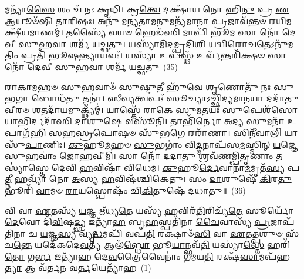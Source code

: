 𑌮𑌨𑍍𑌯𑌾᳴\-\ul{𑌸𑍈} 𑌶𑌂 𑌚᳴ 𑌨𑌃 𑌕𑍃𑌧𑌿। 𑌕𑍍𑌰\-\ul{𑌤𑍍𑌵𑍇} 𑌦𑌕𑍍𑌷𑌾᳴𑌯 𑌨𑍋 𑌹𑌿\-\ul{𑌨𑍁} 𑌪𑍍𑌰 \ul{𑌣} 𑌆𑌯𑍂𑍞᳴𑌷𑌿 𑌤𑌾𑌰𑌿𑌷𑌃। 𑌅𑌨𑍁᳴ 𑌮𑌨𑍍𑌯𑌤𑌾𑌮\-\ul{𑌨𑍁}\-𑌮𑌨𑍍𑌯᳴𑌮𑌾𑌨𑌾 \ul{𑌪𑍍𑌰}\-𑌜𑌾𑌵᳴𑌨𑍍𑌤𑍞 \ul{𑌰}\-𑌯𑌿𑌮𑌕𑍍𑌷𑍀᳴𑌯𑌮𑌾𑌣𑌮𑍍। 𑌤𑌸𑍍𑌯𑍈᳴ \ul{𑌵}\-𑌯𑍞 𑌹𑍇𑌡᳴\-\ul{𑌸𑌿} 𑌮𑌾𑌪𑌿᳴ 𑌭𑍂\-\ul{𑌮} 𑌸𑌾 𑌨𑍋᳴ \ul{𑌦𑍇}\-𑌵𑍀 \ul{𑌸𑍁}\-𑌹\-\ul{𑌵𑌾} 𑌶𑌰𑍍𑌮᳴ 𑌯𑌚𑍍𑌛𑌤𑍁। 𑌯𑌸𑍍𑌯𑌾᳴\-\ul{𑌮𑌿}\-𑌦\-\ul{𑌮𑍍𑌪𑍍𑌰}\-𑌦𑌿\-\ul{𑌶𑌿} 𑌯\-\ul{𑌦𑍍𑌵𑌿}\-𑌰𑍋\-\ul{𑌚}\-𑌤𑍇\-𑌽𑌨𑍁᳴𑌮\-\ul{𑌤𑌿𑌂} 𑌪𑍍𑌰𑌤𑌿᳴ 𑌭𑍂𑌷\-\ul{𑌨𑍍𑌤𑍍𑌯𑌾}\-𑌯𑌵𑌃᳴। 𑌯𑌸𑍍𑌯𑌾᳴ \ul{𑌉}\-𑌪𑌸𑍍𑌥᳴ \ul{𑌉}\-𑌰𑍍𑌵᳴𑌨𑍍𑌤𑌰𑌿᳴\-\ul{𑌕𑍍𑌷}\-\-\ul{𑍞} 𑌸𑌾 𑌨𑍋᳴ \ul{𑌦𑍇}\-𑌵𑍀 \ul{𑌸𑍁}\-𑌹\-\ul{𑌵𑌾} 𑌶𑌰𑍍𑌮᳴ 𑌯𑌚𑍍𑌛𑌤𑍁~(35)

\-\ul{𑌰𑌾}\-𑌕𑌾\-\ul{𑌮}\-𑌹𑍞 \ul{𑌸𑍁}\-𑌹𑌵𑌾𑍞᳴ 𑌸𑍁\-\ul{𑌷𑍍𑌟𑍁}\-𑌤𑍀 𑌹𑍁᳴𑌵𑍇 \ul{𑌶𑍃}\-𑌣𑍋𑌤𑍁᳴ 𑌨𑌃 \ul{𑌸𑍁}\-𑌭\-\ul{𑌗𑌾} 𑌬𑍋𑌧᳴\-\ul{𑌤𑍁} 𑌤𑍍𑌮𑌨𑌾॑। 𑌸𑍀\-\ul{𑌵𑍍𑌯}\-𑌤𑍍𑌵𑌪𑌃᳴ \ul{𑌸𑍂}\-𑌚𑍍𑌯𑌾\-𑌽𑌚𑍍𑌛𑌿᳴𑌦𑍍𑌯𑌮𑌾𑌨\-\ul{𑌯𑌾} 𑌦𑌦𑌾᳴𑌤𑍁 \ul{𑌵𑍀}\-𑌰𑍞 \ul{𑌶}\-𑌤𑌦𑌾᳴𑌯\-\ul{𑌮𑍁}\-𑌕𑍍𑌥𑍍𑌯𑌮𑍍॑। 𑌯𑌾𑌸𑍍𑌤𑍇᳴ 𑌰𑌾𑌕𑍇 𑌸𑍁\-\ul{𑌮}\-𑌤𑌯𑌃᳴ \ul{𑌸𑍁}\-𑌪𑍇𑌶᳴\-\ul{𑌸𑍋} 𑌯𑌾\-\ul{𑌭𑌿}\-𑌰𑍍𑌦𑌦𑌾᳴𑌸𑌿 \ul{𑌦𑌾}\-𑌶𑍁\-\ul{𑌷𑍇} 𑌵𑌸𑍂᳴𑌨𑌿। 𑌤𑌾𑌭𑌿᳴𑌰𑍍𑌨𑍋 \ul{𑌅}\-𑌦𑍍𑌯 \ul{𑌸𑍁}\-𑌮𑌨𑌾᳴ \ul{𑌉}\-𑌪𑌾𑌗᳴𑌹𑌿 𑌸𑌹𑌸𑍍𑌰\-\ul{𑌪𑍋}\-𑌷𑍞 𑌸𑍁᳴𑌭\-\ul{𑌗𑍇} 𑌰𑌰𑌾᳴𑌣𑌾। 𑌸𑌿𑌨𑍀᳴𑌵𑌾\-\ul{𑌲𑌿} 𑌯𑌾 𑌸𑍁᳴\-\ul{𑌪𑌾}\-𑌣𑌿𑌃। \ul{𑌕𑍁}\-𑌹𑍂\-\ul{𑌮}\-𑌹𑍞 \ul{𑌸𑍁}\-𑌭𑌗𑌾𑌂॑ 𑌵𑌿\-\ul{𑌦𑍍𑌮}\-𑌨𑌾𑌪᳴𑌸\-\ul{𑌮}\-𑌸𑍍𑌮𑌿𑌨𑍍 \ul{𑌯}\-𑌜𑍍𑌞𑍇 \ul{𑌸𑍁}\-𑌹𑌵𑌾𑌂॑ 𑌜𑍋𑌹𑌵𑍀𑌮𑌿। 𑌸𑌾 𑌨𑍋᳴ 𑌦𑌦𑌾\-\ul{𑌤𑍁} 𑌶𑍍𑌰𑌵᳴𑌣𑌮𑍍𑌪𑌿\-\ul{𑌤𑍃}\-𑌣𑌾𑌂 𑌤𑌸𑍍𑌯𑌾॑𑌸𑍍𑌤𑍇 𑌦𑍇𑌵𑌿 \ul{𑌹}\-𑌵𑌿𑌷𑌾᳴ 𑌵𑌿𑌧𑍇𑌮। \ul{𑌕𑍁}\-𑌹𑍂\-\ul{𑌰𑍍𑌦𑍇}\-𑌵𑌾𑌨𑌾᳴\-\ul{𑌮}\-𑌮𑍃𑌤᳴\-\ul{𑌸𑍍𑌯} 𑌪\-\ul{𑌤𑍍𑌨𑍀} 𑌹𑌵𑍍𑌯𑌾᳴ 𑌨𑍋 \ul{𑌅}\-𑌸𑍍𑌯 \ul{𑌹}\-𑌵𑌿𑌷᳴𑌶𑍍𑌚𑌿𑌕𑍇𑌤𑍁। 𑌸𑌂 \ul{𑌦𑌾}\-𑌶𑍁𑌷𑍇᳴ \ul{𑌕𑌿}\-𑌰\-\ul{𑌤𑍁} 𑌭𑍂𑌰𑌿᳴ \ul{𑌵𑌾}\-𑌮𑍞 \ul{𑌰𑌾}\-𑌯𑌸𑍍𑌪𑍋𑌷𑌂᳴ 𑌚𑌿\-\ul{𑌕𑌿}\-𑌤𑍁𑌷𑍇᳴ 𑌦𑌧𑌾𑌤𑍁॥~(36)

{\anuvakamend[{𑌭𑌾𑌮𑌾᳴\-\ul{𑌸𑍋} 𑌦𑌾\-\ul{𑌤𑌾} 𑌤𑍍𑌵\-\ul{𑌮}\-𑌨𑍍𑌤𑌰𑌿᳴\-\ul{𑌕𑍍𑌷}\-\-\ul{𑍞} 𑌸𑌾 𑌨𑍋᳴ \ul{𑌦𑍇}\-𑌵𑍀 \ul{𑌸𑍁}\-𑌹\-\ul{𑌵𑌾} 𑌶𑌰𑍍𑌮᳴ 𑌯𑌚𑍍𑌛\-\ul{𑌤𑍁} 𑌶𑍍𑌰𑌵᳴\-\ul{𑌣𑌂} 𑌚𑌤𑍁᳴𑌰𑍍𑌵𑌿𑍞𑌶𑌤𑌿𑌶𑍍𑌚}]}%


{\anuvakamend[{𑌵𑌿 𑌵𑌾 \ul{𑌏}\-𑌤𑌸𑍍𑌯𑌾 𑌵𑌾᳴𑌯𑍋 \ul{𑌇}\-𑌮𑍇 𑌵𑍈 \ul{𑌚𑌿}\-𑌤𑍍𑌤\-\ul{𑌞𑍍𑌚𑌾}\-𑌗𑍍𑌨𑌿\-\ul{𑌰𑍍𑌭𑍂}\-𑌤𑌾𑌨𑌾𑌂॑ \ul{𑌦𑍇}\-𑌵𑌾 𑌵𑌾 𑌅᳴𑌭𑍍𑌯𑌾\-\ul{𑌤𑌾}\-𑌨𑌾𑌨𑍃᳴\-\ul{𑌤𑌾}\-𑌷𑌾\-\ul{𑌡𑍍𑌰𑌾}\-𑌷𑍍𑌟𑍍𑌰𑌕𑌾᳴𑌮𑌾\-\ul{𑌯} 𑌦𑍇𑌵𑌿᳴\-\ul{𑌕𑌾} 𑌵𑌾𑌸𑍍𑌤𑍋॑𑌷𑍍𑌪\-\ul{𑌤𑍇} 𑌤𑍍𑌵𑌮᳴𑌗𑍍𑌨𑍇 \ul{𑌬𑍃}\-𑌹𑌦𑍇𑌕𑌾᳴\-𑌦𑌶}]}%

\setcounter{anuvakam}{0}
𑌵𑌿 𑌵𑌾 \ul{𑌏}\-𑌤𑌸𑍍𑌯᳴ \ul{𑌯}\-𑌜𑍍𑌞 𑌋᳴𑌧𑍍𑌯\-\ul{𑌤𑍇} 𑌯𑌸𑍍𑌯᳴ \ul{𑌹}\-𑌵𑌿𑌰᳴\-\ul{𑌤𑌿}\-𑌰𑌿𑌚𑍍𑌯᳴\-\ul{𑌤𑍇} 𑌸𑍂𑌰𑍍𑌯𑍋᳴ \ul{𑌦𑍇}\-𑌵𑍋 𑌦𑌿᳴\-\ul{𑌵𑌿}\-𑌷\-\ul{𑌦𑍍𑌭𑍍𑌯} 𑌇𑌤𑍍𑌯𑌾᳴\-\ul{𑌹} 𑌬𑍃\-\ul{𑌹}\-𑌸𑍍𑌪𑌤𑌿᳴𑌨𑌾 \ul{𑌚𑍈}\-𑌵𑌾𑌸𑍍𑌯᳴ \ul{𑌪𑍍𑌰}\-𑌜𑌾𑌪᳴𑌤𑌿𑌨𑌾 𑌚 \ul{𑌯}\-𑌜𑍍𑌞\-\ul{𑌸𑍍𑌯} 𑌵𑍍𑌯𑍃᳴\-\ul{𑌦𑍍𑌧}\-𑌮𑌪𑌿᳴ 𑌵𑌪\-\ul{𑌤𑌿} 𑌰𑌕𑍍𑌷𑌾𑍞᳴\-\ul{𑌸𑌿} 𑌵𑌾 \ul{𑌏}\-𑌤\-\ul{𑌤𑍍𑌪}\-𑌶𑍁𑍞 𑌸᳴𑌚\-\ul{𑌨𑍍𑌤𑍇} 𑌯𑌦𑍇᳴𑌕𑌦𑍇\-\ul{𑌵}\-𑌤𑍍𑌯᳴ 𑌆𑌲᳴\-\ul{𑌬𑍍𑌧𑍋} 𑌭𑍂\-\ul{𑌯𑌾}\-𑌨𑍍𑌭𑌵᳴\-\ul{𑌤𑌿} 𑌯𑌸𑍍𑌯𑌾॑\-\ul{𑌸𑍍𑌤𑍇} 𑌹𑌰𑌿᳴\-\ul{𑌤𑍋} 𑌗\-\ul{𑌰𑍍𑌭} 𑌇𑌤𑍍𑌯𑌾᳴𑌹 𑌦𑍇\-\ul{𑌵}\-𑌤𑍍𑌰𑍈𑌵𑍈𑌨𑌾𑌂॑ 𑌗𑌮𑌯\-\ul{𑌤𑌿} 𑌰𑌕𑍍𑌷᳴\-\ul{𑌸𑌾}\-𑌮𑌪᳴𑌹\-\ul{𑌤𑍍𑌯𑌾} 𑌆 𑌵᳴𑌰𑍍𑌤𑌨 𑌵\-\ul{𑌰𑍍𑌤}\-𑌯𑍇𑌤𑍍𑌯𑌾᳴𑌹~(1)

